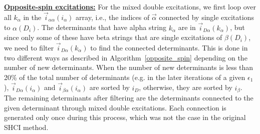 \documentclass[%
reprint,
 superscriptaddress,
 amsmath,amssymb,
 aps,
]{revtex4-1}
\def\vecD{\vec{D}}
\def\veca{\vec{\alpha}}
\def\vecb{\vec{\beta}}
\def\ia{i_\alpha}
\def\ib{i_\beta}
\def\veciDa{\vec{i}_{D\alpha}}
\def\veciaa{\vec{i}_{\alpha\alpha}}
\def\veciba{\vec{i}_{\beta\alpha}}
\begin{document}
\noindent \underline{\bf Opposite-spin excitations:} For the mixed double excitations, we first loop over all $k_\alpha$ in the $\veciaa(\ia)$ array,
i.e., the indices of $\veca$ connected by single excitations to $\alpha(D_i)$.
The determinants that have alpha string $k_\alpha$ are in $\veciDa(k_\alpha)$, but since only some of these
have beta strings that are single excitations of $\beta(D_i)$, we need to filter $\veciDa(k_\alpha)$
to find the connected determinants.
This is done in two different ways as described in Algorithm~\ref{opposite_spin}
depending on the number of new determinants.
When the number of new determinants is less than 20\% of the total number of determinants (e.g. in the later iterations of a given $\epsilon_1$), $\veciDa(\ia)$ and $\veciba(\ia)$ are sorted by $i_D$, otherwise, they are sorted by $\ib$.
The remaining determinants after filtering are the determinants connected to the given determinant through mixed double excitations.
Each connection is generated only once during this process, which was not the case in the
original SHCI method.

\end{document}
